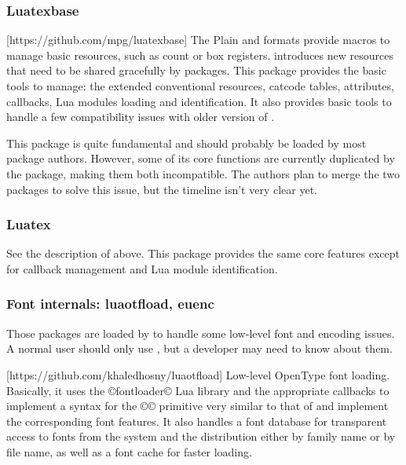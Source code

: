 \documentclass{lltxdoc}
\begin{document}
\subsubsection{Luatexbase}

[https://github.com/mpg/luatexbase]
The Plain and \latex formats provide macros to manage \tex basic resources,
such as count or box registers. \luatex introduces new resources that need to
be shared gracefully by packages. This package provides the basic tools to
manage: the extended conventional \tex resources, catcode tables, attributes,
callbacks, Lua modules loading and identification. It also provides basic
tools to handle a few compatibility issues with older version of \luatex.

This package is quite fundamental and should probably be loaded by most
package authors. However, some of its core functions are currently duplicated
by the  package, making them both incompatible. The authors plan to
merge the two packages to solve this issue, but the timeline isn't very clear
yet.

\subsubsection{Luatex}

See the description of  above. This package provides the same
core features except for callback management and Lua module identification.

\subsubsection{Font internals: luaotfload, euenc}\label{fontint}

Those packages are loaded by  to handle some low-level font and
encoding issues. A normal user should only use , but a developer
may need to know about them.

\medskip
{}[https://github.com/khaledhosny/luaotfload]
Low-level OpenType font loading. Basically, it uses the ©fontloader© Lua
library and the appropriate callbacks to implement a syntax for the ©\font©
primitive very similar to that of \xetex and implement the corresponding font
features. It also handles a font database for transparent access to fonts from
the system and the \tex distribution either by family name or by file name, as
well as a font cache for faster loading.
\end{document}
